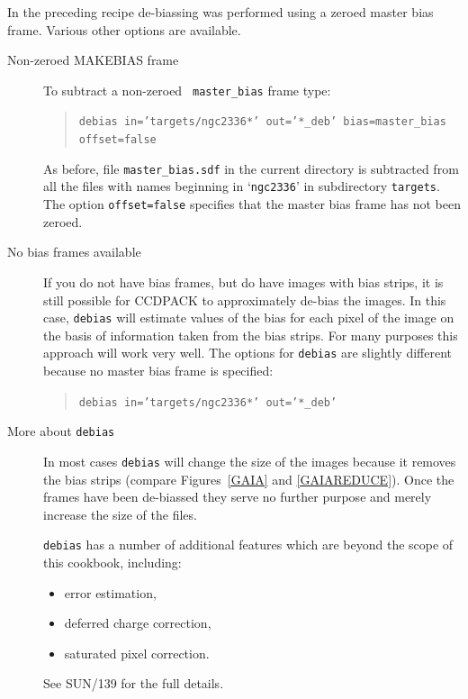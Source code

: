 \documentclass[twoside,11pt]{article}
\newcommand{\xref}[3]{#1}
\begin{document}
In the preceding recipe de-biassing was performed using a zeroed master
bias frame.  Various other options are available.

\begin{description}

  \item[Non-zeroed MAKEBIAS frame] To subtract a non-zeroed {\tt
   master\_bias} frame type:

  \begin{quote}
   {\tt debias~in='targets/ngc2336*'~out='*\_deb'~bias=master\_bias
   offset=false}
  \end{quote}

   As before, file {\tt master\_bias.sdf} in the current directory is
   subtracted from all the files with names beginning in `{\tt ngc2336}'
   in subdirectory {\tt targets}.  The option {\tt offset=false}
   specifies that the master bias frame has not been zeroed.

  \item[No bias frames available] If you do not have bias frames, but do
   have images with bias strips, it is still possible for CCDPACK to
   approximately de-bias the images.  In this case, {\tt debias} will
   estimate values of the bias for each pixel of the image on the basis of
   information taken from the bias strips. For many purposes this approach
   will work very well.  The options for {\tt debias} are slightly
   different because no master bias frame is specified:

  \begin{quote}
   {\tt debias in='targets/ngc2336*' out='*\_deb'}
  \end{quote}

  \item[More about {\tt debias}] In most cases {\tt debias} will change
   the size of the images because it removes the bias strips (compare
   Figures~\ref{GAIA} and \ref{GAIAREDUCE}).  Once the frames have
   been de-biassed they serve no further purpose and merely increase
   the size of the files.

   {\tt debias} has a number of additional features which are beyond the
   scope of this cookbook, including:
 
  \begin{itemize}

    \item error estimation,

    \item deferred charge correction,

    \item saturated pixel correction. 

  \end{itemize}

   See \xref{SUN/139}{sun139}{}\/\cite{SUN139} for the full details.

\end{description}
\end{document}
